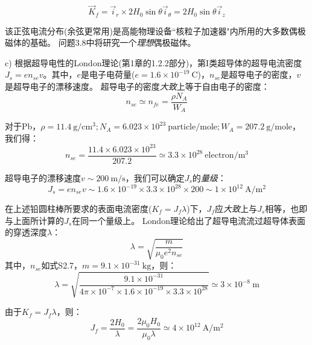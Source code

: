 \begin{equation*}
  \vec{K}_f=\vec{i}_r \times 2H_0\sin\theta \vec{i}_\theta=2H_0\sin\theta\vec{i}_z\tag{2.43}
\end{equation*}

该正弦电流分布(余弦更常用)是高能物理设备``核粒子加速器"内所用的大多数偶极磁体的基础。
问题3.8中将研究一个\textit{理想}偶极磁体。


c) 根据超导电性的London理论(第1章的1.2.2部分)，第I类超导体的超导电流密度$J_s=en_{se}v$。其中，$e$是电子电荷量($e=1.6\times 10^{-19}\ \mathrm{C}$)，$n_{se}$是超导电子的密度，$v$是超导电子的漂移速度。
超导电子的密度\textit{大致}上等于自由电子的密度：
\begin{equation*}
n_{se}\simeq n_{fe}=\frac{\rho N_A}{W_A} \tag{1.2}
\end{equation*}

对于Pb，$\rho=11.4\ \mathrm{g/cm^3};N_A=6.023\times 10^{23}\ \mathrm{particle/mole};W_A=207.2\ \mathrm{g/mole}$，我们得：
\begin{equation*}
n_{se}=\frac{11.4\times 6.023\times 10^{23}}{207.2} \simeq 3.3\times 10^{28}\ \mathrm{electron/m^3} \tag{S2.7}
\end{equation*}

超导电子的漂移速度$v\sim 200\ \mathrm{m/s}$，我们可以确定$J_s$的\textit{量级}：
\begin{equation*}
J_s=e n_{se} v\sim 1.6\times 10^{-19} \times 3.3\times 10^{28} \times 200 \sim 1\times 10^{12}\ \mathrm{A/m^2} 
\end{equation*}

在上述铅圆柱棒所要求的表面电流密度($K_f=J_f \lambda$)下，$J_f$应\textit{大致}上与$J_s$相等，也即与上面所计算的$J_s$在同一个量级上。
London理论给出了超导电流流过超导体表面的穿透深度$\lambda$：
\begin{equation*}
\lambda=\sqrt{\frac{m}{\mu_0 e^2 n_{se}}} \tag{1.1}
\end{equation*}
其中，$n_{se}$如式S2.7，$m=9.1\times 10^{-31}\ \mathrm{kg}$，则：
\begin{equation*}
\lambda=\sqrt{\frac{9.1\times 10^{-31}}{4\pi \times 10^{-7}\times 1.6\times 10^{-19}\times 3.3\times 10^{28}}}\simeq 3\times 10^{-8}\ \mathrm{m}
\end{equation*}

由于$K_f=J_f\lambda$，则：
\begin{equation*}
J_f=\frac{2H_0}{\lambda}=\frac{2\mu_0 H_0}{\mu_0 \lambda}\simeq 4\times 10^{12} \ \mathrm{A/m^2}  \tag{S2.9}
\end{equation*}

